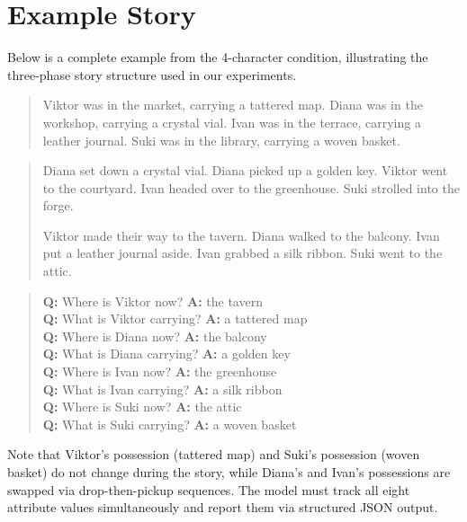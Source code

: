 \section{Example Story}
\label{app:example}

Below is a complete example from the 4-character condition, illustrating the three-phase story structure used in our experiments.

\begin{quote}
\small
Viktor was in the market, carrying a tattered map.
Diana was in the workshop, carrying a crystal vial.
Ivan was in the terrace, carrying a leather journal.
Suki was in the library, carrying a woven basket.
\end{quote}

\begin{quote}
\small
Diana set down a crystal vial. Diana picked up a golden key.
Viktor went to the courtyard.
Ivan headed over to the greenhouse.
Suki strolled into the forge.

Viktor made their way to the tavern.
Diana walked to the balcony.
Ivan put a leather journal aside. Ivan grabbed a silk ribbon.
Suki went to the attic.
\end{quote}

\begin{quote}
\small
\textbf{Q:} Where is Viktor now? \textbf{A:} the tavern \\
\textbf{Q:} What is Viktor carrying? \textbf{A:} a tattered map \\
\textbf{Q:} Where is Diana now? \textbf{A:} the balcony \\
\textbf{Q:} What is Diana carrying? \textbf{A:} a golden key \\
\textbf{Q:} Where is Ivan now? \textbf{A:} the greenhouse \\
\textbf{Q:} What is Ivan carrying? \textbf{A:} a silk ribbon \\
\textbf{Q:} Where is Suki now? \textbf{A:} the attic \\
\textbf{Q:} What is Suki carrying? \textbf{A:} a woven basket
\end{quote}

Note that Viktor's possession (tattered map) and Suki's possession (woven basket) do not change during the story, while Diana's and Ivan's possessions are swapped via drop-then-pickup sequences.
The model must track all eight attribute values simultaneously and report them via structured JSON output.
